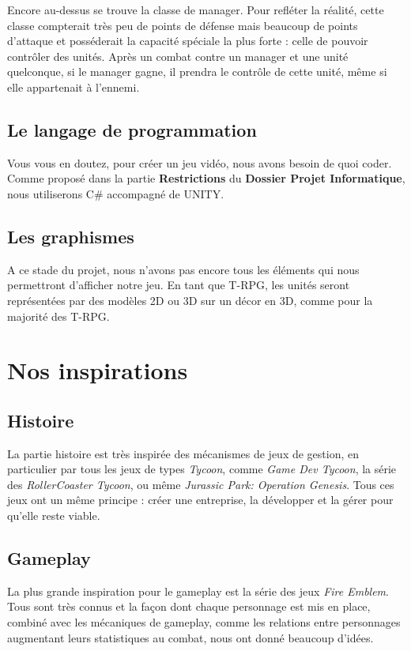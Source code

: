\documentclass{article}
\begin{document}
Encore au-dessus se trouve la classe de manager. Pour refléter la réalité, cette classe compterait très peu de points de défense mais beaucoup de points d'attaque et posséderait la capacité spéciale la plus forte : celle de pouvoir contrôler des unités. Après un combat contre un manager et une unité quelconque, si le manager gagne, il prendra le contrôle de cette unité, même si elle appartenait à l'ennemi. 

\subsection{Le langage de programmation}
Vous vous en doutez, pour créer un jeu vidéo, nous avons besoin de quoi coder. Comme proposé dans la partie \textbf{Restrictions} du \textbf{Dossier Projet Informatique}, nous utiliserons C\# accompagné de UNITY. 

\subsection{Les graphismes}
A ce stade du projet, nous n'avons pas encore tous les éléments qui nous permettront d'afficher notre jeu. En tant que T-RPG, les unités seront représentées par des modèles 2D ou 3D sur un décor en 3D, comme pour la majorité des T-RPG.

\section{Nos inspirations}
\subsection{Histoire}
La partie histoire est très inspirée des mécanismes de jeux de gestion, en particulier par tous les jeux de types \textit{Tycoon}, comme \textit{Game Dev Tycoon}, la série des \textit{RollerCoaster Tycoon}, ou même \textit{Jurassic Park: Operation Genesis}. Tous ces jeux ont un même principe : créer une entreprise, la développer et la gérer pour qu'elle reste viable.
\subsection{Gameplay}
La plus grande inspiration pour le gameplay est la série des jeux \textit{Fire Emblem}. Tous sont très connus et la façon dont chaque personnage est mis en place, combiné avec les mécaniques de gameplay, comme les relations entre personnages augmentant leurs statistiques au combat, nous ont donné beaucoup d'idées.
\end{document}
